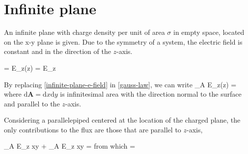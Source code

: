 \section{Infinite plane}
An infinite plane with charge density per unit of area $\sigma$ in empty space, located on the x-y plane is given. Due to the symmetry of a
system, the electric field is constant and in the direction of the $z$-axis.


\be\label{infinite-plane-e-field}
 = E_{z}(z) \cdot {} = E_z \cdot {}
\ee

By replacing \ref{infinite-plane-e-field} in \ref{gauss-law}, we can write
\be\label{infinite-plane-flux}
\oiint_A E_{z}(z) \cdot {} \cdot {} =
\ee
where $\mathrm{d}\mathbf{A} = \mathrm{d}x \mathrm{d}y$ is infinitesimal area with the direction normal to the surface and parallel to the
$z$-axis.

Considering a parallelepiped centered at the location of the charged plane, the only contributions to the flux are those that are parallel
to $z$-axis,


\be\label{}
\oiint_A E_z \cdot {} \cdot {}xy + \oiint_A E_z \cdot {} \cdot {}xy = 
\ee
from which
\be
{}= \cdot {} 
\ee

